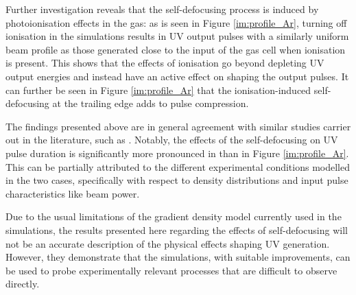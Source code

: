 \documentclass[a4paper]{jpconf}
\begin{document}
Further investigation reveals that the self-defocusing process is induced by photoionisation effects in the gas: as is seen in Figure \ref{im:profile_Ar}, turning off ionisation in the simulations results in UV output pulses with a similarly uniform beam profile as those generated close to the input of the gas cell when ionisation is present. This shows that the effects of ionisation go beyond depleting UV output energies and instead have an active effect on shaping the output pulses. It can further be seen in Figure \ref{im:profile_Ar} that the ionisation-induced self-defocusing at the trailing edge adds to pulse compression. \par 
The findings presented above are in general agreement with similar studies carrier out in the literature, such as \cite{reiter2010}.  Notably, the effects of the self-defocusing on UV pulse duration is significantly more pronounced in \cite{reiter2010} than in Figure \ref{im:profile_Ar}. This can be partially attributed to the different experimental conditions modelled in the two cases, specifically with respect to density distributions and input pulse characteristics like beam power. \par 
Due to the usual limitations of the gradient density model currently used in the simulations, the results presented here regarding the effects of self-defocusing will not be an accurate description of the physical effects shaping UV generation. However, they demonstrate that the simulations, with suitable improvements, can be used to probe experimentally relevant processes that are difficult to observe directly. 
\end{document}
